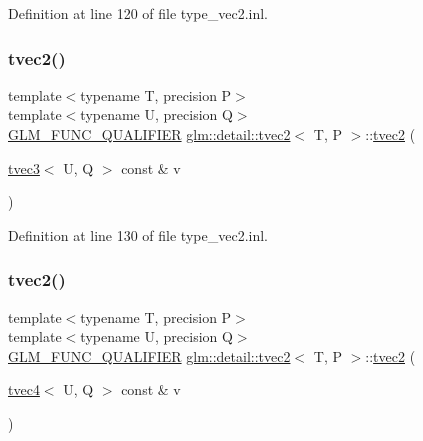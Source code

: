 Definition at line 120 of file type\+\_\+vec2.\+inl.

\mbox{\label{structglm_1_1detail_1_1tvec2_a9dd6ae59acae6434a5ca48e06b01953d}} 
\subsubsection{\texorpdfstring{tvec2()}{tvec2()}\hspace{0.1cm}{\footnotesize\ttfamily [14/15]}}
{\footnotesize\ttfamily template$<$typename T, precision P$>$ \\
template$<$typename U, precision Q$>$ \\
\hyperlink{setup_8hpp_a33fdea6f91c5f834105f7415e2a64407}{G\+L\+M\+\_\+\+F\+U\+N\+C\+\_\+\+Q\+U\+A\+L\+I\+F\+I\+ER} \hyperlink{structglm_1_1detail_1_1tvec2}{glm\+::detail\+::tvec2}$<$ T, P $>$\+::\hyperlink{structglm_1_1detail_1_1tvec2}{tvec2} (\begin{DoxyParamCaption}\item[{\hyperlink{structglm_1_1detail_1_1tvec3}{tvec3}$<$ U, Q $>$ const \&}]{v }\end{DoxyParamCaption})}



Definition at line 130 of file type\+\_\+vec2.\+inl.

\mbox{\label{structglm_1_1detail_1_1tvec2_aca6e6031778d2739ec29acfdfc744dc1}} 
\subsubsection{\texorpdfstring{tvec2()}{tvec2()}\hspace{0.1cm}{\footnotesize\ttfamily [15/15]}}
{\footnotesize\ttfamily template$<$typename T, precision P$>$ \\
template$<$typename U, precision Q$>$ \\
\hyperlink{setup_8hpp_a33fdea6f91c5f834105f7415e2a64407}{G\+L\+M\+\_\+\+F\+U\+N\+C\+\_\+\+Q\+U\+A\+L\+I\+F\+I\+ER} \hyperlink{structglm_1_1detail_1_1tvec2}{glm\+::detail\+::tvec2}$<$ T, P $>$\+::\hyperlink{structglm_1_1detail_1_1tvec2}{tvec2} (\begin{DoxyParamCaption}\item[{\hyperlink{structglm_1_1detail_1_1tvec4}{tvec4}$<$ U, Q $>$ const \&}]{v }\end{DoxyParamCaption})}



